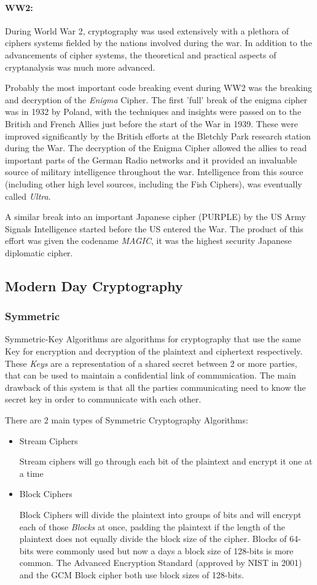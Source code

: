 \paragraph{WW2:}
During World War 2, cryptography was used extensively with a plethora of ciphers systems fielded by the nations involved during the war. In addition to the advancements of cipher systems, the theoretical and practical aspects of cryptanalysis was much more advanced.

Probably the most important code breaking event during WW2 was the breaking and decryption of the \textit{Enigma} Cipher. The first 'full' break of the enigma cipher was in 1932 by Poland, with the techniques and insights were passed on to the British and French Allies just before the start of the War in 1939. These were improved significantly by the British efforts at the Bletchly Park research station during the War. The decryption of the Enigma Cipher allowed the allies to read important parts of the German Radio networks and it provided an invaluable source of military intelligence throughout the war. Intelligence from this source (including other high level sources, including the Fish Ciphers), was eventually called \textit{Ultra}. 

A similar break into an important Japanese cipher (PURPLE) by the US Army Signals Intelligence started before the US entered the War. The product of this effort was given the codename \textit{MAGIC}, it was the highest security Japanese diplomatic cipher.

\subsection{Modern Day Cryptography}
\subsubsection{Symmetric}
Symmetric-Key Algorithms are algorithms for cryptography that use the same Key for encryption and decryption of the plaintext and ciphertext respectively. These \textit{Keys} are a representation of a shared secret between 2 or more parties, that can be used to maintain a confidential link of communication. The main drawback of this system is that all the parties communicating need to know the secret key in order to communicate with each other.

There are 2 main types of Symmetric Cryptography Algorithms:
\begin{itemize}
\item{Stream Ciphers

Stream ciphers will go through each bit of the plaintext and encrypt it one at a time
}
\item{Block Ciphers

Block Ciphers will divide the plaintext into groups of bits and will encrypt each of those \textit{Blocks} at once, padding the plaintext if the length of the plaintext does not equally divide the block size of the cipher. Blocks of 64-bits were commonly used but now a days a block size of 128-bits is more common. The Advanced Encryption Standard (approved by NIST in 2001) and the GCM Block cipher both use block sizes of 128-bits.
}
\end{itemize}

